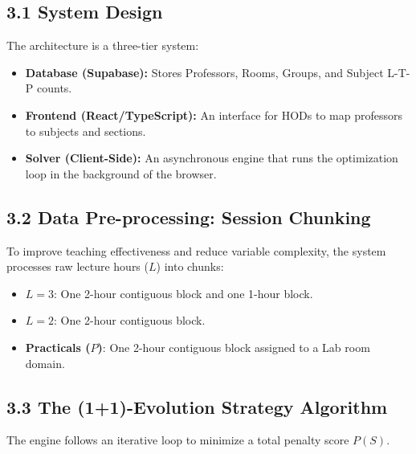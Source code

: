 \documentclass{article}
\begin{document}
\subsection*{3.1 System Design}
The architecture is a three-tier system:
\begin{itemize}
    \item \textbf{Database (Supabase):} Stores Professors, Rooms, Groups, and Subject L-T-P counts.
    \item \textbf{Frontend (React/TypeScript):} An interface for HODs to map professors to subjects and sections.
    \item \textbf{Solver (Client-Side):} An asynchronous engine that runs the optimization loop in the background of the browser.
\end{itemize}

\subsection*{3.2 Data Pre-processing: Session Chunking}
To improve teaching effectiveness and reduce variable complexity, the system processes raw lecture hours ($L$) into chunks:
\begin{itemize}
    \item \textbf{$L = 3$}: One 2-hour contiguous block and one 1-hour block.
    \item \textbf{$L = 2$}: One 2-hour contiguous block.
    \item \textbf{Practicals ($P$)}: One 2-hour contiguous block assigned to a Lab room domain.
\end{itemize}

\subsection*{3.3 The (1+1)-Evolution Strategy Algorithm}
The engine follows an iterative loop to minimize a total penalty score $P(S)$.
\end{document}
